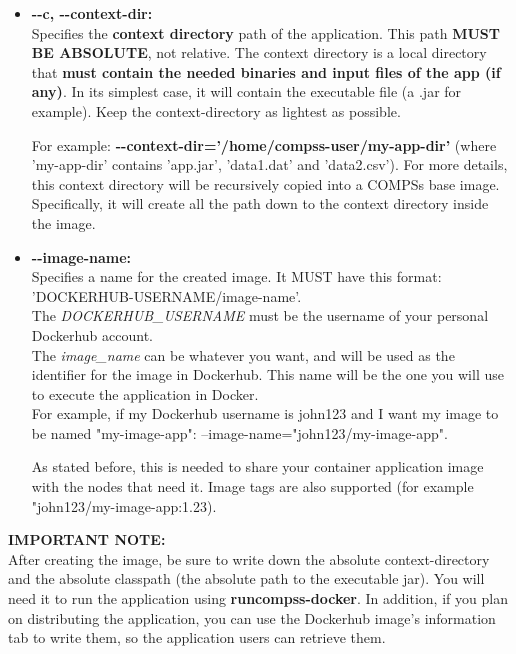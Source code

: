 \begin{itemize}
 \item { 
 \textbf{-{}-c, -{}-context-dir:} \\ 
 Specifies the \textbf{context directory} path of the application. This path \textbf{MUST BE ABSOLUTE}, not relative.
 The context directory is a local directory that \textbf{must contain the needed binaries and input files of the app (if any)}.
 In its simplest case, it will contain the executable file (a .jar for example). Keep the context-directory as lightest as possible.
 
 For example: \textbf{-{}-context-dir='/home/compss-user/my-app-dir'} (where 'my-app-dir' contains 'app.jar', 'data1.dat' and 'data2.csv').
 For more details, this context directory will be recursively copied into a COMPSs base image. 
 Specifically, it will create all the path down to the context directory inside the image.
 }
 
 \item { 
 \textbf{-{}-image-name:} \\
 Specifies a name for the created image. It MUST have this format: 'DOCKERHUB-USERNAME/image-name'. \\
 The \textit{DOCKERHUB\_USERNAME} must be the username of your personal Dockerhub account. \\
 The \textit{image\_name} can be whatever you want, and will be used as the identifier for the image in Dockerhub.
 This name will be the one you will use to execute the application in Docker. \\
    For example, if my Dockerhub username is john123 and I want my image to be named "my-image-app": --image-name="john123/my-image-app".
 
 As stated before, this is needed to share your container application image with the nodes that need it.
 Image tags are also supported (for example "john123/my-image-app:1.23). 
 } 
\end{itemize}

\textbf{IMPORTANT NOTE:} \\ 
After creating the image, be sure to write down the absolute context-directory and the absolute classpath (the absolute path to the executable jar).
You will need it to run the application using \textbf{runcompss-docker}. In addition, if you plan on distributing the application,
you can use the Dockerhub image's information tab to write them, so the application users can retrieve them.

 
